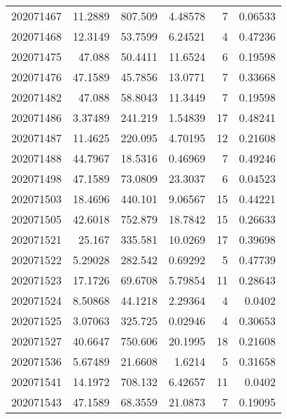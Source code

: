 \begin{tabular}{rrrrrr}
 202071467 &         11.2889  &      807.509  &            4.48578 &           7 & 0.06533 \\
 202071468 &         12.3149  &       53.7599 &            6.24521 &           4 & 0.47236 \\
 202071475 &         47.088   &       50.4411 &           11.6524  &           6 & 0.19598 \\
 202071476 &         47.1589  &       45.7856 &           13.0771  &           7 & 0.33668 \\
 202071482 &         47.088   &       58.8043 &           11.3449  &           7 & 0.19598 \\
 202071486 &          3.37489 &      241.219  &            1.54839 &          17 & 0.48241 \\
 202071487 &         11.4625  &      220.095  &            4.70195 &          12 & 0.21608 \\
 202071488 &         44.7967  &       18.5316 &            0.46969 &           7 & 0.49246 \\
 202071498 &         47.1589  &       73.0809 &           23.3037  &           6 & 0.04523 \\
 202071503 &         18.4696  &      440.101  &            9.06567 &          15 & 0.44221 \\
 202071505 &         42.6018  &      752.879  &           18.7842  &          15 & 0.26633 \\
 202071521 &         25.167   &      335.581  &           10.0269  &          17 & 0.39698 \\
 202071522 &          5.29028 &      282.542  &            0.69292 &           5 & 0.47739 \\
 202071523 &         17.1726  &       69.6708 &            5.79854 &          11 & 0.28643 \\
 202071524 &          8.50868 &       44.1218 &            2.29364 &           4 & 0.0402  \\
 202071525 &          3.07063 &      325.725  &            0.02946 &           4 & 0.30653 \\
 202071527 &         40.6647  &      750.606  &           20.1995  &          18 & 0.21608 \\
 202071536 &          5.67489 &       21.6608 &            1.6214  &           5 & 0.31658 \\
 202071541 &         14.1972  &      708.132  &            6.42657 &          11 & 0.0402  \\
 202071543 &         47.1589  &       68.3559 &           21.0873  &           7 & 0.19095 \\

\end{tabular}
